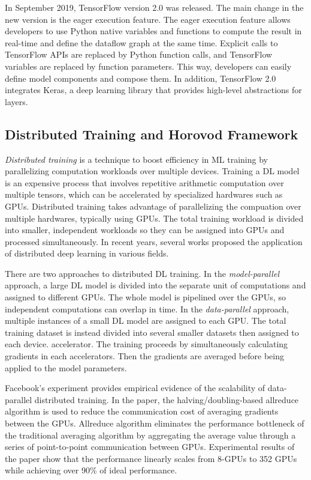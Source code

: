 In September 2019, TensorFlow version 2.0 was released\cite{tf2announce}.
The main change in the new version is the eager execution feature.
The eager execution feature allows developers to use Python native variables
and functions to compute the result in real-time and define the
dataflow graph at the same time.
Explicit calls to TensorFlow APIs are replaced by Python function calls,
and TensorFlow variables are replaced by function parameters.
This way, developers can easily define model components and compose them. 
In addition, TensorFlow 2.0 integrates Keras\cite{keras},
a deep learning library that provides high-level abstractions for layers.


\subsection{Distributed Training and Horovod Framework}

\textit{Distributed training} is a technique to boost efficiency in ML training
by parallelizing computation workloads over multiple devices.
Training a DL model is an expensive process that involves repetitive
arithmetic computation over multiple tensors,
which can be accelerated by specialized hardwares such as GPUs. 
Distributed training takes advantage of parallelizing the compuation over
multiple hardwares, typically using GPUs.
The total training workload is divided into smaller, independent workloads
so they can be assigned into GPUs and processed simultaneously. 
In recent years, several works proposed the application of distributed
deep learning in various fields.

There are two approaches to distributed DL training.
In the \textit{model-parallel} approach, a large DL model is divided into 
the separate unit of computations and assigned to different GPUs. 
The whole model is pipelined over the GPUs, so independent computations
can overlap in time.
In the \textit{data-parallel} approach, multiple instances of a small DL model
are assigned to each GPU. The total training dataset is instead
divided into several smaller datasets then assigned to each device.
accelerator. The training proceeds by simultaneously calculating gradients
in each accelerators. Then the gradients are averaged before being 
applied to the model parameters.

Facebook's experiment \cite{facebook2018} provides empirical evidence of
the scalability of data-parallel distributed training. In the paper, 
the halving/doubling-based allreduce algorithm is used to reduce the communication 
cost of averaging gradients between the GPUs. 
Allreduce algorithm eliminates the performance bottleneck of the traditional
averaging algorithm by aggregating the average value through a series of
point-to-point communication between GPUs. 
Experimental results of the paper show that the performance linearly
scales from 8-GPUs to 352 GPUs while achieving over 90\% of ideal performance.

